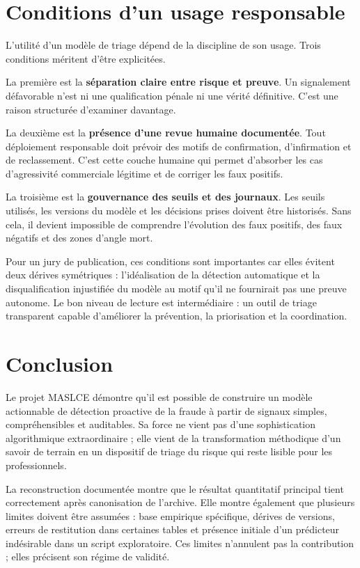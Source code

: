 \documentclass[10pt,a4paper]{article}
\begin{document}
\section{Conditions d'un usage responsable}
L'utilité d'un modèle de triage dépend de la discipline de son usage. Trois conditions méritent d'être explicitées.

La première est la \textbf{séparation claire entre risque et preuve}. Un signalement défavorable n'est ni une qualification pénale ni une vérité définitive. C'est une raison structurée d'examiner davantage.

La deuxième est la \textbf{présence d'une revue humaine documentée}. Tout déploiement responsable doit prévoir des motifs de confirmation, d'infirmation et de reclassement. C'est cette couche humaine qui permet d'absorber les cas d'agressivité commerciale légitime et de corriger les faux positifs.

La troisième est la \textbf{gouvernance des seuils et des journaux}. Les seuils utilisés, les versions du modèle et les décisions prises doivent être historisés. Sans cela, il devient impossible de comprendre l'évolution des faux positifs, des faux négatifs et des zones d'angle mort.

Pour un jury de publication, ces conditions sont importantes car elles évitent deux dérives symétriques : l'idéalisation de la détection automatique et la disqualification injustifiée du modèle au motif qu'il ne fournirait pas une preuve autonome. Le bon niveau de lecture est intermédiaire : un outil de triage transparent capable d'améliorer la prévention, la priorisation et la coordination.

\section{Conclusion}
Le projet MASLCE démontre qu'il est possible de construire un modèle actionnable de détection proactive de la fraude à partir de signaux simples, compréhensibles et auditables. Sa force ne vient pas d'une sophistication algorithmique extraordinaire ; elle vient de la transformation méthodique d'un savoir de terrain en un dispositif de triage du risque qui reste lisible pour les professionnels.

La reconstruction documentée montre que le résultat quantitatif principal tient correctement après canonisation de l'archive. Elle montre également que plusieurs limites doivent être assumées : base empirique spécifique, dérives de versions, erreurs de restitution dans certaines tables et présence initiale d'un prédicteur indésirable dans un script exploratoire. Ces limites n'annulent pas la contribution ; elles précisent son régime de validité.
\end{document}
